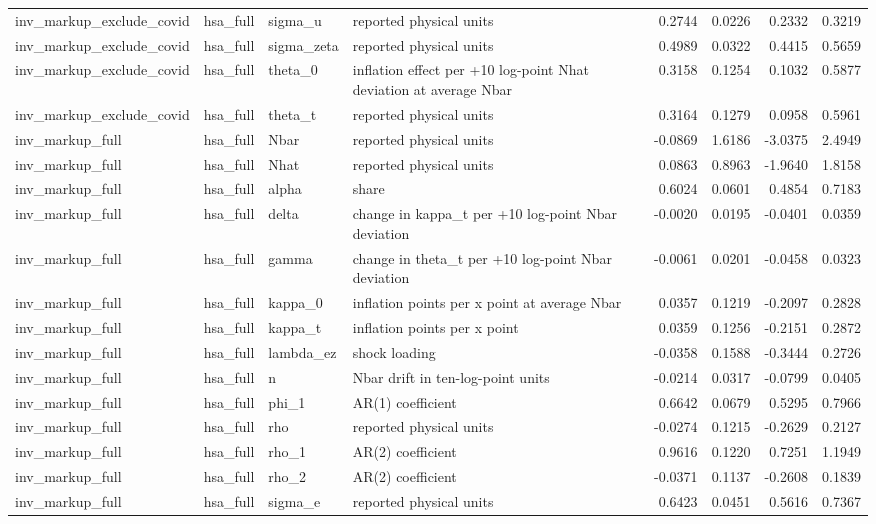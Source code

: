 \begin{tabular}{llllrrrr}
inv\_markup\_exclude\_covid & hsa\_full & sigma\_u & reported physical units & 0.2744 & 0.0226 & 0.2332 & 0.3219 \\
inv\_markup\_exclude\_covid & hsa\_full & sigma\_zeta & reported physical units & 0.4989 & 0.0322 & 0.4415 & 0.5659 \\
inv\_markup\_exclude\_covid & hsa\_full & theta\_0 & inflation effect per +10 log-point Nhat deviation at average Nbar & 0.3158 & 0.1254 & 0.1032 & 0.5877 \\
inv\_markup\_exclude\_covid & hsa\_full & theta\_t & reported physical units & 0.3164 & 0.1279 & 0.0958 & 0.5961 \\
inv\_markup\_full & hsa\_full & Nbar & reported physical units & -0.0869 & 1.6186 & -3.0375 & 2.4949 \\
inv\_markup\_full & hsa\_full & Nhat & reported physical units & 0.0863 & 0.8963 & -1.9640 & 1.8158 \\
inv\_markup\_full & hsa\_full & alpha & share & 0.6024 & 0.0601 & 0.4854 & 0.7183 \\
inv\_markup\_full & hsa\_full & delta & change in kappa\_t per +10 log-point Nbar deviation & -0.0020 & 0.0195 & -0.0401 & 0.0359 \\
inv\_markup\_full & hsa\_full & gamma & change in theta\_t per +10 log-point Nbar deviation & -0.0061 & 0.0201 & -0.0458 & 0.0323 \\
inv\_markup\_full & hsa\_full & kappa\_0 & inflation points per x point at average Nbar & 0.0357 & 0.1219 & -0.2097 & 0.2828 \\
inv\_markup\_full & hsa\_full & kappa\_t & inflation points per x point & 0.0359 & 0.1256 & -0.2151 & 0.2872 \\
inv\_markup\_full & hsa\_full & lambda\_ez & shock loading & -0.0358 & 0.1588 & -0.3444 & 0.2726 \\
inv\_markup\_full & hsa\_full & n & Nbar drift in ten-log-point units & -0.0214 & 0.0317 & -0.0799 & 0.0405 \\
inv\_markup\_full & hsa\_full & phi\_1 & AR(1) coefficient & 0.6642 & 0.0679 & 0.5295 & 0.7966 \\
inv\_markup\_full & hsa\_full & rho & reported physical units & -0.0274 & 0.1215 & -0.2629 & 0.2127 \\
inv\_markup\_full & hsa\_full & rho\_1 & AR(2) coefficient & 0.9616 & 0.1220 & 0.7251 & 1.1949 \\
inv\_markup\_full & hsa\_full & rho\_2 & AR(2) coefficient & -0.0371 & 0.1137 & -0.2608 & 0.1839 \\
inv\_markup\_full & hsa\_full & sigma\_e & reported physical units & 0.6423 & 0.0451 & 0.5616 & 0.7367 \\

\end{tabular}
